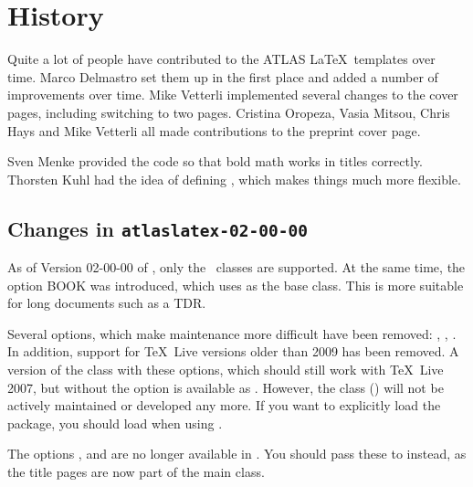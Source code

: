 \section{History}

Quite a lot of people have contributed to the ATLAS \LaTeX\ templates over time.
Marco Delmastro set them up in the first place and added a number of improvements over time.
Mike Vetterli implemented several changes to the cover pages, including switching to two pages.
Cristina Oropeza, Vasia Mitsou, Chris Hays and Mike Vetterli all made contributions to the preprint cover page.

Sven Menke provided the code so that bold math works in titles correctly.
Thorsten Kuhl had the idea of defining , which makes things much more flexible.

\subsection{Changes in \texttt{atlaslatex-02-00-00}}
\label{sec:atlaslatex2}

As of Version 02-00-00 of , only the \KOMAScript\ classes are supported.
At the same time, the option BOOK was introduced, which uses  as the base class.
This is more suitable for long documents such as a TDR.

Several options, which make maintenance more difficult have been removed:
, , .
In addition, support for \TeX\ Live versions older than 2009 has been removed.
A version of the class with these options, which should still work with \TeX\ Live 2007,
but without the  option is available as .
However, the class () will not be actively maintained or developed any more.
If you want to explicitly load the  package,
you should load  when using .

The options ,  and  are no longer available
in .
You should pass these to  instead, as the title pages are now part of the main class.


